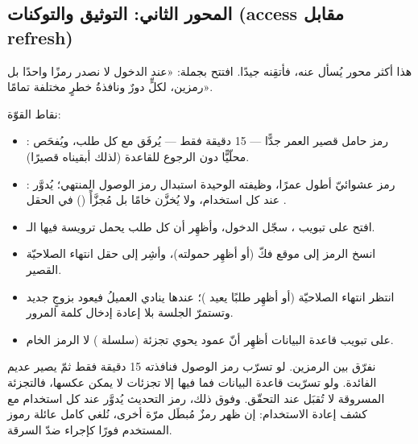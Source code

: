 \subsection{المحور الثاني: التوثيق والتوكنات (access مقابل refresh)}

هذا أكثر محور يُسأل عنه، فأتقِنه جيدًا. افتتح بجملة: «عند الدخول لا نصدر رمزًا
واحدًا بل رمزين، لكلٍّ دورٌ ونافذةُ خطرٍ مختلفة تمامًا».

نقاط القوّة:
\begin{itemize}
\item {}: رمز حامل قصير العمر جدًّا — 15 دقيقة فقط — يُرفَق مع كل طلب،
  ويُفحَص محلّيًّا دون الرجوع للقاعدة (لذلك أبقيناه قصيرًا).
\item {}: رمز عشوائيّ أطول عمرًا، وظيفته الوحيدة استبدال رمز الوصول
  المنتهي؛ يُدوَّر عند كل استخدام، ولا يُخزَّن خامًا بل مُجزَّأً () في
  الحقل .
\end{itemize}

\begin{idea}
\begin{itemize}
\item افتح  على تبويب ، سجّل الدخول، وأظهِر أن كل طلب يحمل
  ترويسة  فيها الـ.
\item انسخ الرمز إلى موقع فكّ  (أو أظهِر حمولته)، وأشِر إلى حقل انتهاء
  الصلاحيّة القصير.
\item انتظر انتهاء الصلاحيّة (أو أظهِر طلبًا يعيد )؛ عندها ينادي العميلُ
   فيعود بزوجٍ جديد وتستمرّ الجلسة بلا إعادة إدخال كلمة المرور.
\item على تبويب قاعدة البيانات أظهِر أنّ عمود  يحوي
  تجزئة (سلسلة ) لا الرمز الخام.
\end{itemize}
\end{idea}

\begin{qa}
نفرّق بين الرمزين. لو تسرّب رمز الوصول فنافذته 15 دقيقة فقط ثمّ يصير عديم الفائدة.
ولو تسرّبت قاعدة البيانات فما فيها إلا تجزئات لا يمكن عكسها، فالتجزئة المسروقة لا
تُقبَل عند التحقّق. وفوق ذلك، رمز التحديث يُدوَّر عند كل استخدام مع كشف إعادة
الاستخدام: إن ظهر رمزٌ مُبطَل مرّة أخرى، نُلغي كامل عائلة رموز المستخدم فورًا كإجراء
ضدّ السرقة.
\end{qa}

